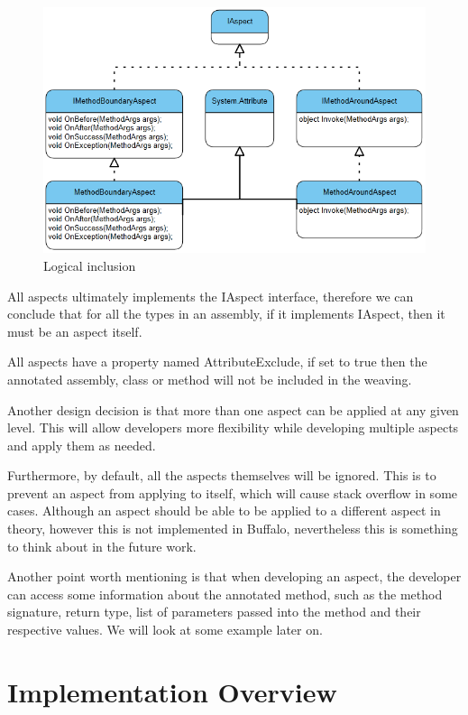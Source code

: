 \begin{figure}[here]
  \includegraphics[scale=1.0]{Uml01.PNG}
  \centering
  \caption{Logical inclusion\label{uml01}}
\end{figure}

All aspects ultimately implements the IAspect interface, therefore we can conclude that for all the types in an assembly, if it implements IAspect, then it must be an aspect itself.

All aspects have a property named AttributeExclude, if set to true then the annotated assembly, class or method will not be included in the weaving.

Another design decision is that more than one aspect can be applied at any given level. This will allow developers more flexibility while developing multiple aspects and apply them as needed.

Furthermore, by default, all the aspects themselves will be ignored. This is to prevent an aspect from applying to itself, which will cause stack overflow in some cases. Although an aspect should be able to be applied to a different aspect in theory, however this is not implemented in Buffalo, nevertheless this is something to think about in the future work.

Another point worth mentioning is that when developing an aspect, the developer can access some information about the annotated method, such as the method signature, return type, list of parameters passed into the method and their respective values. We will look at some example later on.

\section{Implementation Overview}

